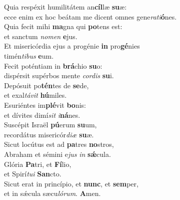 \oddverse Quia respéxit humilitátem an\textbf{cíl}læ \textbf{su}æ:~\*\\
\oddverse ecce enim ex hoc beátam me dicent omnes gene\textit{ra}\textit{ti}\textbf{ó}nes.\\
\evenverse Quia fecit mihi \textbf{ma}gna qui \textbf{po}tens est:~\*\\
\evenverse et sanctum \textit{no}\textit{men} \textbf{e}jus.\\
\oddverse Et misericórdia ejus a progénie \textbf{in} pro\textbf{gé}nies~\*\\
\oddverse timén\textit{ti}\textit{bus} \textbf{e}um.\\
\evenverse Fecit poténtiam in \textbf{brá}chio \textbf{su}o:~\*\\
\evenverse dispérsit supérbos mente \textit{cor}\textit{dis} \textbf{su}i.\\
\oddverse Depósuit po\textbf{tén}tes de \textbf{se}de,~\*\\
\oddverse et exal\textit{tá}\textit{vit} \textbf{hú}miles.\\
\evenverse Esuriéntes im\textbf{plé}vit \textbf{bo}nis:~\*\\
\evenverse et dívites dimí\textit{sit} \textit{i}\textbf{ná}nes.\\
\oddverse Suscépit Israël \textbf{pú}erum \textbf{su}um,~\*\\
\oddverse recordátus misericór\textit{di}\textit{æ} \textbf{su}æ.\\
\evenverse Sicut locútus est ad \textbf{pa}tres \textbf{no}stros,~\*\\
\evenverse Abraham et sémini e\textit{jus} \textit{in} \textbf{sǽ}cula.\\
\oddverse Glória \textbf{Pa}tri, et \textbf{Fí}lio,~\*\\
\oddverse et Spirí\textit{tu}\textit{i} \textbf{San}cto.\\
\evenverse Sicut erat in princípio, et \textbf{nunc}, et \textbf{sem}per,~\*\\
\evenverse et in sǽcula sæcu\textit{ló}\textit{rum}. \textbf{A}men.\\
